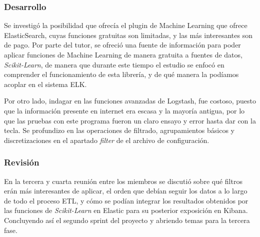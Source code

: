 \subsubsection{Desarrollo}
Se investigó la posibilidad que ofrecía el plugin de Machine Learning que ofrece ElasticSearch, cuyas funciones gratuitas son limitadas, y las más interesantes son de pago. Por parte del tutor, se ofreció una fuente de información para poder aplicar funciones de Machine Learning de manera gratuita a fuentes de datos, \textit{Scikit-Learn}, de manera que durante este tiempo el estudio se enfocó en comprender el funcionamiento de esta librería, y de qué manera la podíamos acoplar en el sistema ELK.

Por otro lado, indagar en las funciones avanzadas de Logstash, fue costoso, puesto que la información presente en internet era escasa y la mayoría antigua, por lo que las pruebas con este programa fueron un claro ensayo y error hasta dar con la tecla. Se profundizo en las operaciones de filtrado, agrupamientos básicos y discretizaciones en el apartado \textit{filter} de el archivo de configuración.

\subsubsection{Revisión}
En la tercera y cuarta reunión entre los miembros se discutió sobre qué filtros erán más interesantes de aplicar, el orden que debían seguir los datos a lo largo de todo el proceso ETL, y cómo se podían integrar los resultados obtenidos por las funciones de \textit{Scikit-Learn} en Elastic para su posterior exposición en Kibana. Concluyendo así el segundo sprint del proyecto y abriendo temas para la tercera fase.

\paragraph{}
\paragraph{}
\paragraph{}
\paragraph{}
\paragraph{}

